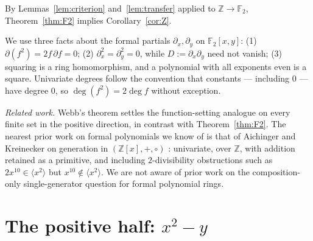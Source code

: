 \documentclass[11pt]{article}
\theoremstyle{definition}
\newcommand{\F}{\mathbb{F}}
\newcommand{\Z}{\mathbb{Z}}
\begin{document}
By Lemmas~\ref{lem:criterion} and~\ref{lem:transfer} applied to
$\Z \to \F_2$, Theorem~\ref{thm:F2} implies Corollary~\ref{cor:Z}.

We use three facts about the formal partials
$\partial_x, \partial_y$ on $\F_2[x,y]$:
(1) $\partial(f^2) = 2f\,\partial f = 0$;
(2) $\partial_x^2 = \partial_y^2 = 0$, while
$D := \partial_x \partial_y$ need not vanish;
(3) squaring is a ring homomorphism, and a polynomial with all
exponents even is a square.
Univariate degrees follow the convention that constants ---
including $0$ --- have degree $0$, so $\deg(f^2) = 2\deg f$ without
exception.

\medskip

\noindent\emph{Related work.}  Webb's theorem \cite{Webb} settles
the function-setting analogue on every finite set in the positive
direction, in contrast with Theorem~\ref{thm:F2}.  The nearest prior
work on formal polynomials we know of is that of Aichinger and
Kreinecker on generation in $(\Z[x], +, \circ)$
\cite{Aichinger2013,AichingerKreinecker}: univariate, over $\Z$,
with addition retained as a primitive, and including
$2$-divisibility obstructions such as
$2x^{10} \in \langle x^2 \rangle$ but
$x^{10} \notin \langle x^2 \rangle$.  We are not aware of prior work
on the composition-only single-generator question for formal
polynomial rings.

\section{The positive half: $x^2 - y$}\label{sec:converse}
\end{document}
